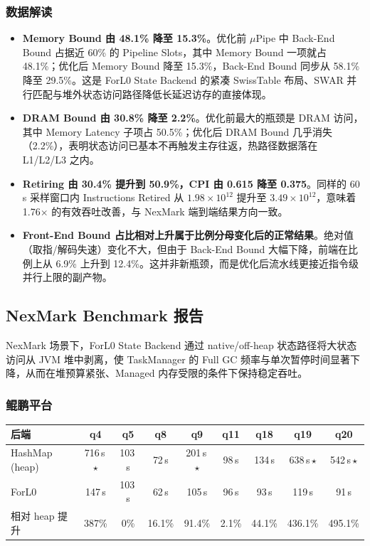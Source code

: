 \documentclass[a4paper,11pt]{article}
\newcommand{\project}{ForL0 State Backend}
\begin{document}
\subsubsection{数据解读}

\begin{itemize}
  \item \textbf{Memory Bound 由 48.1\% 降至 15.3\%}。优化前 $\mu$Pipe 中 Back-End Bound 占据近 60\% 的 Pipeline Slots，其中 Memory Bound 一项就占 48.1\%；优化后 Memory Bound 降至 15.3\%，Back-End Bound 同步从 58.1\% 降至 29.5\%。这是 \project{} 的紧凑 SwissTable 布局、SWAR 并行匹配与堆外状态访问路径降低长延迟访存的直接体现。
  \item \textbf{DRAM Bound 由 30.8\% 降至 2.2\%}。优化前最大的瓶颈是 DRAM 访问，其中 Memory Latency 子项占 50.5\%；优化后 DRAM Bound 几乎消失（2.2\%），表明状态访问已基本不再触发主存往返，热路径数据落在 L1/L2/L3 之内。
  \item \textbf{Retiring 由 30.4\% 提升到 50.9\%，CPI 由 0.615 降至 0.375}。同样的 60\,s 采样窗口内 Instructions Retired 从 $1.98\times 10^{12}$ 提升至 $3.49\times 10^{12}$，意味着 1.76$\times$ 的有效吞吐改善，与 NexMark 端到端结果方向一致。
  \item \textbf{Front-End Bound 占比相对上升属于比例分母变化后的正常结果}。绝对值（取指/解码失速）变化不大，但由于 Back-End Bound 大幅下降，前端在比例上从 6.9\% 上升到 12.4\%。这并非新瓶颈，而是优化后流水线更接近指令级并行上限的副产物。
\end{itemize}

\subsection{NexMark Benchmark 报告}

NexMark 场景下，\project{} 通过 native/off-heap 状态路径将大状态访问从 JVM 堆中剥离，使 TaskManager 的 Full GC 频率与单次暂停时间显著下降，从而在堆预算紧张、Managed 内存受限的条件下保持稳定吞吐。

\subsubsection{鲲鹏平台}

\begin{table}[H]
\centering
\footnotesize
\setlength{\tabcolsep}{4pt}
\begin{tabular}{@{}l cccccccc@{}}
\toprule
\textbf{后端} & \textbf{q4} & \textbf{q5} & \textbf{q8} & \textbf{q9} & \textbf{q11} & \textbf{q18} & \textbf{q19} & \textbf{q20} \\
\midrule
HashMap\,(heap)        & 716\,s\,$\star$ & 103\,s & 72\,s  & 201\,s\,$\star$ & 98\,s  & 134\,s & 638\,s\,$\star$ & 542\,s\,$\star$ \\
ForL0                  & 147\,s         & 103\,s & 62\,s  & 105\,s         & 96\,s  & 93\,s  & 119\,s         & 91\,s  \\
\midrule
相对 heap 提升          & 387\% & 0\%    & 16.1\% & 91.4\%  & 2.1\%  & 44.1\% & 436.1\% & 495.1\% \\
\bottomrule
\end{tabular}
\end{table}
\end{document}
